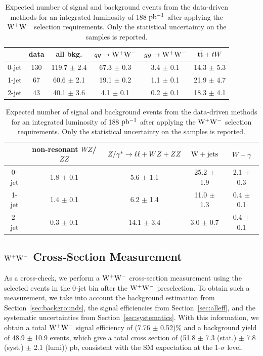 \begin{table}[!ht]
  \begin{center}
 {\small
  \begin{tabular} {|c|c|c|c|c|c|}
\hline
          &   data & all bkg. & $qq \to \mathrm{W}^+\mathrm{W}^-$ & $gg \to \mathrm{W}^+\mathrm{W}^-$ &  $\mathrm{t}\bar{\mathrm{t}}+tW$ \\
  \hline
  \hline
 0-jet &  130 & 119.7 $\pm$  2.4  & 67.3 $\pm$ 0.3 &  3.4 $\pm$   0.1 &  14.3 $\pm$ 5.3 \\
 1-jet &   67 &  60.6 $\pm$  2.1  & 19.1 $\pm$ 0.2 &  1.1 $\pm$   0.1 &  21.9 $\pm$ 4.7 \\
 2-jet &   43 &  40.1 $\pm$  3.6  &  4.1 $\pm$ 0.1 &  0.2 $\pm$   0.1 &  18.3 $\pm$ 4.1 \\
 \hline
 \hline
  \end{tabular}
  \begin{tabular} {|c|c|c|c|c|}
\hline
       & non-resonant $WZ$/$ZZ$ & $Z/\gamma^*\to\ell\ell+WZ+ZZ$ & $\mathrm{W+jets}$& $W+\gamma$ \\
  \hline
  \hline
 0-jet &   1.8 $\pm$	0.1 &  5.6 $\pm$   1.1 & 25.2 $\pm$   1.9 & 2.1 $\pm$   0.3  \\
 1-jet &   1.4 $\pm$	0.1 &  6.2 $\pm$   1.4 & 11.0 $\pm$   1.3 & 0.4 $\pm$   0.1 \\
 2-jet &   0.3 $\pm$	0.1 & 14.1 $\pm$   3.4 &  3.0 $\pm$   0.7 & 0.4 $\pm$   0.1 \\
 \hline
 \hline
  \end{tabular}
  }
  \caption{Expected number of signal and background events from the data-driven methods for an 
  integrated luminosity of 188 $\mathrm{pb^{-1}}$ after applying the $\mathrm{W}^+\mathrm{W}^-$ selection requirements. 
  Only the statistical uncertainty on the samples is reported.}
   \label{tab:wwselection_all}
  \end{center}
\end{table}

\subsection{$\mathrm{W}^+\mathrm{W}^-$ Cross-Section Measurement}
As a cross-check, we perform a $\mathrm{W}^+\mathrm{W}^-$ cross-section measurement using the selected events 
in the 0-jet bin after the $\mathrm{W}^+\mathrm{W}^-$ preselection. To obtain such a measurement, we take into 
account the background estimation from Section~\ref{sec:backgrounds}, the signal efficiencies 
from Section~\ref{sec:alleff}, and the systematic uncertainties from 
Section~\ref{sec:systematics}. With this information, we obtain a total 
$\mathrm{W}^+\mathrm{W}^-$ signal efficiency of (7.76 $\pm$  0.52)\% and a background yield of 48.9 $\pm$ 10.9 events, which 
give a total cross section of (51.8 $\pm$   7.3 (stat.) $\pm$   7.8 (syst.) $\pm$   2.1 (lumi)) pb, 
consistent with the SM expectation at the 1-$\sigma$ level.

